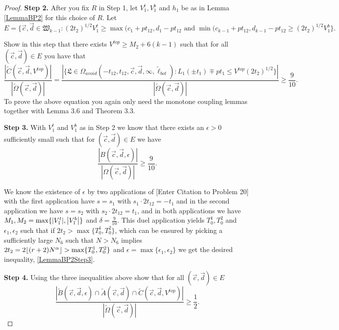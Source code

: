 \begin{proof}
	{\bf \raggedleft Step 2.} After you fix $R$ in Step 1, let $V_1^t, V_1^b$ and $h_1$ be as in Lemma \ref{LemmaBP2}  for this choice of $R$. Let 
	$$E = \{ \vec{c}, \vec{d} \in \mathfrak{W}_{k-1}: (2t_2)^{1/2} V_1^t \geq \max(c_1 + p t_{12}, d_1 - pt_{12} \mbox{ and }\min(c_{k-1} + p t_{12}, d_{k-1} - pt_{12}  \geq (2t_2)^{1/2} V_1^b \}.$$
	
	Show in this step that there exists $V^{top} \geq M_2 + 6(k-1)$ such that for all $(\vec{c}, \vec{d}) \in E$ you have that 
	\begin{equation}
	\frac{|\tilde{C}(\vec{c}, \vec{d}, V^{top})|}{|\tilde{\Omega}(\vec{c},\vec{d})|}= \frac{|\{ \mathfrak{L} \in \Omega_{avoid}(-t_{12}, t_{12}, \vec{c}, \vec{d}, \infty, \tilde{\ell}_{bot}): L_{1}(\pm t_{1}) \mp pt_1 \leq V^{top} (2t_2)^{1/2} \}|}{|\tilde{\Omega}(\vec{c}, \vec{d})|} \geq  \frac{9}{10}.
	\end{equation}
	To prove the above equation you again only need the monotone coupling lemmas together with Lemma 3.6 and Theorem 3.3.
	
	{\bf \raggedleft Step 3.} With $V_1^t$ and $V_1^b$ as in Step 2 we know that there exists an $\epsilon > 0$ sufficiently small such that for $(\vec{c}, \vec{d}) \in E$ we have
	\begin{equation}\label{LemmaBP2Step3}
	\frac{|B(\vec{c}, \vec{d}, \epsilon)|}{|\Omega(\vec{c}, \vec{d})|} \geq  \frac{9}{10}.
	\end{equation}
	
	We know the existence of $\epsilon$ by two applications of [Enter Citation to Problem 20] with the first application have $s=s_1$ with $s_1\cdot 2t_{12}=-t_1$ and in the second application we have $s=s_2$ with $s_2\cdot 2t_{12}=t_1$, and in both applications we have $M_1,M_2=\max\{\abs*{V_1^t},\abs*{V_1^b}\}$ and $\delta=\frac{9}{10}$. This duel application yields $T_0^1, T_0^2$ and $\epsilon_1, \epsilon_2$ such that if $2t_2>\max\{T_0^1, T_0^2\}$, which can be ensured by picking a sufficiently large $N_6$ such that $N>N_6$ implies $2t_2=2\lfloor(r+2)N^\alpha\rfloor>\max\{T_0^1, T_0^2\}$ and $\epsilon=\max\{\epsilon_1,\epsilon_2\}$ we get the desired inequality, \ref{LemmaBP2Step3}.
	
	{\bf \raggedleft Step 4.} Using the three inequalities above show that for all $(\vec{c}, \vec{d}) \in E$
	\begin{equation}
	\frac{|\tilde{B}(\vec{c}, \vec{d}, \epsilon) \cap \tilde{A}(\vec{c}, \vec{d}) \cap \tilde{C}(\vec{c}, \vec{d}, V^{top}) |}{|\tilde{\Omega}(\vec{c}, \vec{d})|} \geq  \frac{1}{2}.
	\end{equation}
	

\end{proof}
